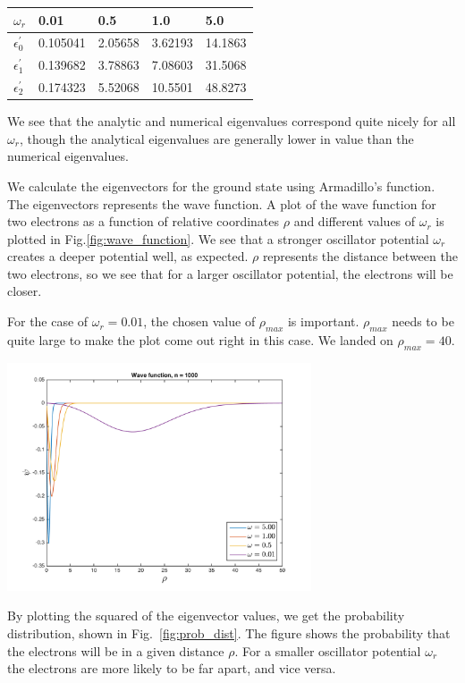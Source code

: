 \documentclass{article}
\begin{document}
\begin{multicols}{2}
\begin{center}
\begin{tabular}{ l l l l l }\hline
	$\omega_r$ 	& 0.01		& 0.5				& 1.0		&5.0\\ \hline
	$\epsilon_0^{'}$ 	& 0.105041	& 2.05658		& 3.62193	& 14.1863\\
	$\epsilon_1^{'}$ 	& 0.139682	& 3.78863		& 7.08603& 31.5068 \\
	$\epsilon_2^{'}$ 	& 0.174323	& 5.52068		& 10.5501	& 48.8273\\
	\hline
\end{tabular}
\end{center}
We see that the analytic and numerical eigenvalues correspond quite nicely for all $\omega_r$, though the analytical eigenvalues are generally lower in value than the numerical eigenvalues.

We calculate the eigenvectors for the ground state using Armadillo's \verb@eigsym@ function. The eigenvectors represents the wave function. A plot of the wave function for two electrons as a function of relative coordinates $\rho$ and different values of $\omega_r$ is plotted in Fig.\ref{fig:wave_function}. We see that a stronger oscillator potential $\omega_r$ creates a deeper potential well, as expected. $\rho$ represents the distance between the two electrons, so we see that for a larger oscillator potential, the electrons will be closer.

For the case of $\omega_r = 0.01$, the chosen value of $\rho_{max}$ is important. $\rho_{max}$ needs to be quite large to make the plot come out right in this case. We landed on $\rho_{max} = 40$.

\begin{center}
	\includegraphics[width=90mm]{../build-Project2-Desktop_Qt_5_5_0_clang_64bit-Debug/wave_function.png} 	
	\label{fig:wave_function}
\end{center}
By plotting the squared of the eigenvector values, we get the probability distribution, shown in Fig.~\ref{fig:prob_dist}. The figure shows the probability that the electrons will be in a given distance $\rho$.  For a smaller oscillator potential $\omega_r$ the electrons are more likely to be far apart, and vice versa.


\end{multicols}
\end{document}
